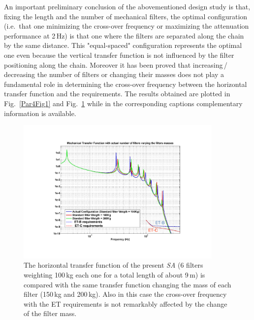 %
An important preliminary conclusion of the abovementioned design study is that, fixing the length and the number of mechanical filters, the optimal configuration (i.e.\ that one minimizing the cross-over frequency or maximizing the attenuation performance at 2\,Hz) is that one where the filters are separated along the chain by the same distance. This "equal-spaced" configuration represents the optimal one even because the vertical transfer function is not influenced by the filter positioning along the chain. Moreover it has been proved that increasing\,/\,decreasing the number of filters or changing their masses does not play a fundamental role in determining the cross-over frequency between the horizontal transfer function and the requirements. The results obtained are plotted in Fig.~\ref{Par4Fig1} and Fig.~\ref{Par4Fig2} while in the corresponding captions complementary information is available.  
%
\begin{figure}[t]
	\begin{center}
		\includegraphics[width=0.9\textwidth]{Detector/SASandSUS/SuspensionSystems/Suspension_Figures/Par4-Fig2.pdf}
			\caption{The horizontal transfer function of the present \emph{SA} (6 filters weighting 100\,kg each one for a total length of about 9\,m) is compared with the same transfer function changing the mass of each filter (150\,kg and 200\,kg). Also in this case the cross-over frequency with the ET requirements is not remarkably affected by the change of the filter mass.}
\label{Par4Fig2}
	\end{center}
\end{figure}
%
